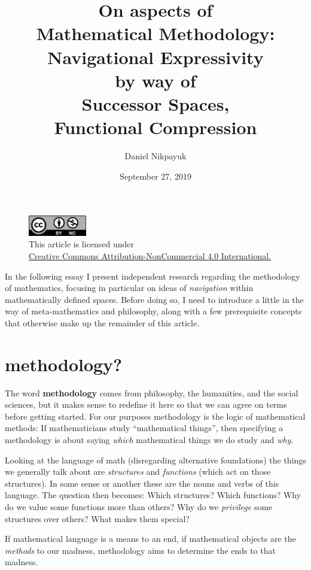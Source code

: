 \documentclass[twoside]{article}
\title{On aspects of\\Mathematical Methodology:\\Navigational Expressivity\\by way of\\Successor Spaces,\\Functional Compression}
\author{Daniel Nikpayuk}
\date{September 27, 2019}
\begin{document}
\maketitle

\begin{figure}[h]
\centering
\includegraphics[width=1in]{../../../cc-by-nc.png}\\[0.1in]
\tiny This article is licensed under \\
\href{http://creativecommons.org/licenses/by-nc/4.0/}
{Creative Commons Attribution-NonCommercial 4.0 International.}\\[0.3in]
\end{figure}

In the following essay I present independent research regarding the methodology of mathematics, focusing in
particular on ideas of \emph{navigation} within mathematically defined spaces. Before doing so, I need to introduce
a little in the way of meta-mathematics and philosophy, along with a few prerequisite concepts that otherwise make
up the remainder of this article.

\section*{methodology?}

The word {\bfseries methodology} comes from philosophy, the humanities, and the social sciences, but it makes sense
to redefine it here so that we can agree on terms before getting started. For our purposes methodology is the logic
of mathematical methods: If mathematicians study ``mathematical things'', then specifying a methodology is about
saying \emph{which} mathematical things we do study and \emph{why}.

Looking at the language of math (disregarding alternative foundations) the things we generally talk about are
\emph{structures} and \emph{functions} (which act on those structures). In some sense or another these are
the nouns and verbs of this language. The question then becomes: Which structures? Which functions? Why do
we value some functions more than others? Why do we \emph{privilege} some structures over others? What makes
them special?

If mathematical language is a means to an end, if mathematical objects are the \emph{methods} to our madness,
methodology aims to determine the ends to that madness.
\end{document}
